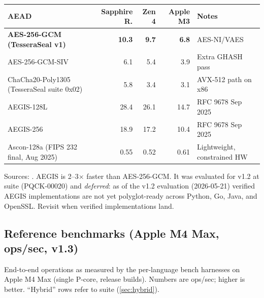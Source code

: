 \begin{center}
\small
\begin{tabular}{@{}lrrrl@{}}
\toprule
\textbf{AEAD} & \textbf{Sapphire R.} & \textbf{Zen 4} & \textbf{Apple M3} & \textbf{Notes} \\
\midrule
\textbf{AES-256-GCM (TesseraSeal v1)} & \textbf{10.3} & \textbf{9.7} & \textbf{6.8} & AES-NI/VAES \\
AES-256-GCM-SIV & 6.1 & 5.4 & 3.9 & Extra GHASH pass \\
ChaCha20-Poly1305 (TesseraSeal suite 0x02) & 5.8 & 3.4 & 3.1 & AVX-512 path on x86 \\
AEGIS-128L & 28.4 & 26.1 & 14.7 & RFC 9678 Sep 2025 \\
AEGIS-256 & 18.9 & 17.2 & 10.4 & RFC 9678 Sep 2025 \\
Ascon-128a (FIPS 232 final, Aug 2025) & 0.55 & 0.52 & 0.61 & Lightweight, constrained HW \\
\bottomrule
\end{tabular}
\end{center}

Sources: \citep{ebacs,intelisa,rfc9678}. AEGIS is 2--3$\times$ faster than AES-256-GCM. It was evaluated for v1.2 at suite  (PQCK-00020) and \emph{deferred}: as of the v1.2 evaluation (2026-05-21) verified AEGIS implementations are not yet polyglot-ready across Python, Go, Java, and OpenSSL. Revisit when verified implementations land.

\subsection{Reference benchmarks (Apple M4 Max, ops/sec, v1.3)}
\label{sec:comparison:bench}

End-to-end \pqcrypt{} operations as measured by the per-language bench harnesses on Apple M4 Max (single P-core, release builds). Numbers are ops/sec; higher is better. ``Hybrid'' rows refer to suite  (\cref{sec:hybrid}).

